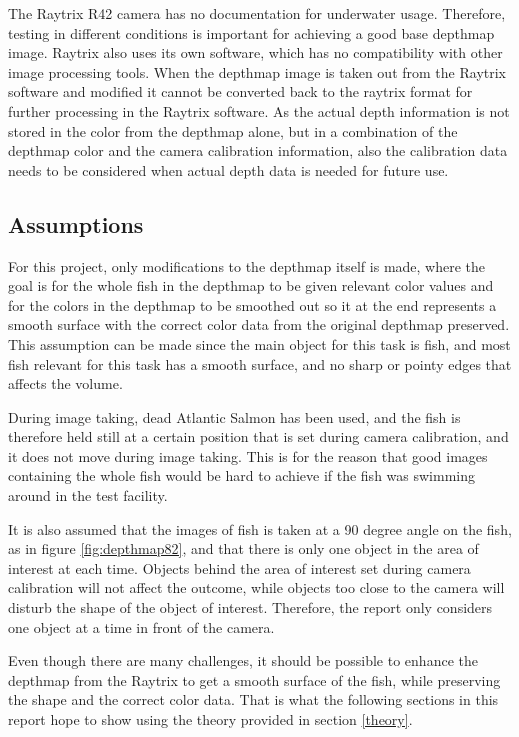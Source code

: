 The Raytrix R42 camera has no documentation for underwater usage. Therefore, testing in different conditions is important for achieving a good base depthmap image. Raytrix also uses its own software, which has no compatibility with other image processing tools. When the depthmap image is taken out from the Raytrix software and modified it cannot be converted back to the raytrix format for further processing in the Raytrix software. As the actual depth information is not stored in the color from the depthmap alone, but in a combination of the depthmap color and the camera calibration information, also the calibration data needs to be considered when actual depth data is needed for future use. 



\subsection{Assumptions}

For this project, only modifications to the depthmap itself is made, where the goal is for the whole fish in the depthmap to be given relevant color values and for the colors in the depthmap to be smoothed out so it at the end represents a smooth surface with the correct color data from the original depthmap preserved. This assumption can be made since the main object for this task is fish, and most fish relevant for this task has a smooth surface, and no sharp or pointy edges that affects the volume. 

During image taking, dead Atlantic Salmon has been used, and the fish is therefore held still at a certain position that is set during camera calibration, and it does not move during image taking. This is for the reason that good images containing the whole fish would be hard to achieve if the fish was swimming around in the test facility.

It is also assumed that the images of fish is taken at a 90 degree angle on the fish, as in figure \ref{fig:depthmap82}, and that there is only one object in the area of interest at each time. Objects behind the area of interest set during camera calibration will not affect the outcome, while objects too close to the camera will disturb the shape of the object of interest. Therefore, the report only considers one object at a time in front of the camera.

Even though there are many challenges, it should be possible to enhance the depthmap from the Raytrix to get a smooth surface of the fish, while preserving the shape and the correct color data. That is what the following sections in this report hope to show using the theory provided in section \ref{theory}.